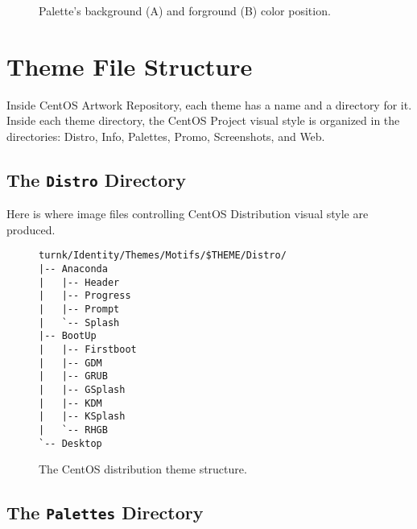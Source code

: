 \begin{figure}[!hbp]
\begin{center}
\end{center}
\caption{Palette's background (A) and forground (B) color position.%
    \label{fig:Concepts:Identity:Themes:Palettes:Syslinux}}
\end{figure}

\section{Theme File Structure}
\hypertarget{sec:Concepts:Identity:Themes:Files}{}
\label{sec:Concepts:Identity:Themes:Files}

Inside CentOS Artwork Repository, each theme has a name and a
directory for it. Inside each theme directory, the CentOS Project
visual style is organized in the directories: Distro, Info, Palettes,
Promo, Screenshots, and Web. 

\subsection{The \texttt{Distro} Directory}
\hypertarget{sec:Concepts:Identity:Themes:Files:Distro}{}
\label{sec:Concepts:Identity:Themes:Files:Distro}

Here is where image files controlling CentOS Distribution visual style
are produced. 

\begin{figure}[!hbp]
\hrulefill
\begin{verbatim}
turnk/Identity/Themes/Motifs/$THEME/Distro/
|-- Anaconda
|   |-- Header
|   |-- Progress
|   |-- Prompt
|   `-- Splash
|-- BootUp
|   |-- Firstboot
|   |-- GDM
|   |-- GRUB
|   |-- GSplash
|   |-- KDM
|   |-- KSplash
|   `-- RHGB
`-- Desktop
\end{verbatim}
\hrulefill
\caption{The CentOS distribution theme structure.}
\end{figure}

\subsection{The \texttt{Palettes} Directory}
\hypertarget{sec:Concepts:Identity:Themes:Files:Palettes}{}
\label{sec:Concepts:Identity:Themes:Files:Palettes}

